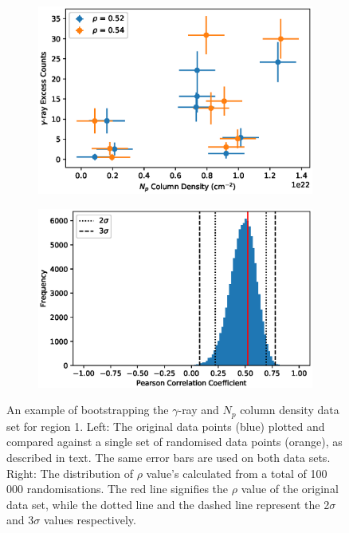 \documentclass[12pt,a4paper]{article}
\begin{document}
\begin{figure}[H]
	\begin{subfigure}{0.47\textwidth}
		\centering
		\includegraphics[width=0.95\linewidth, height=0.22\textheight]{bootstrap_example}
	\end{subfigure}
	\begin{subfigure}{0.53\textwidth}
		\centering
		\includegraphics[width=0.95\linewidth, height=0.22\textheight]{gammopHI_reg1}
	\end{subfigure}
	\caption{An example of bootstrapping the $\gamma$-ray and $N_p$ column density data set for region 1. Left: The original data points (blue) plotted and compared against a single set of randomised data points (orange), as described in text. The same error bars are used on both data sets. Right: The distribution of $\rho$ value's calculated from a total of 100 000 randomisations. The red line signifies the $\rho$ value of the original data set, while the dotted line and the dashed line represent the 2$\sigma$ and 3$\sigma$ values respectively.}
	\label{fig:bootstrap example}
\end{figure}
\end{document}
